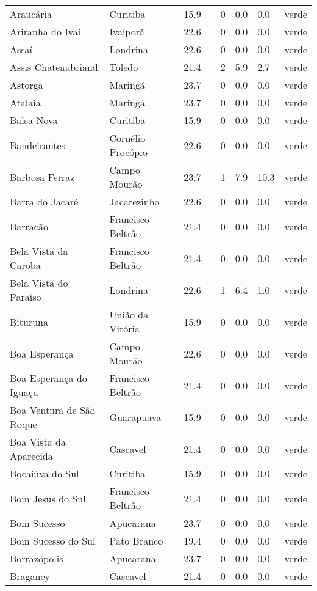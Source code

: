 \begin{longtable}{l|lllllll}
  Araucária & Curitiba & 15.9 &  & 0 & 0.0 & 0.0 & verde \\ 
  Ariranha do Ivaí & Ivaiporã & 22.6 &  & 0 & 0.0 & 0.0 & verde \\ 
  Assaí & Londrina & 22.6 &  & 0 & 0.0 & 0.0 & verde \\ 
  Assis Chateaubriand & Toledo & 21.4 &  & 2 & 5.9 & 2.7 & verde \\ 
  Astorga & Maringá & 23.7 &  & 0 & 0.0 & 0.0 & verde \\ 
  Atalaia & Maringá & 23.7 &  & 0 & 0.0 & 0.0 & verde \\ 
  Balsa Nova & Curitiba & 15.9 &  & 0 & 0.0 & 0.0 & verde \\ 
  Bandeirantes & Cornélio Procópio & 22.6 &  & 0 & 0.0 & 0.0 & verde \\ 
  Barbosa Ferraz & Campo Mourão & 23.7 &  & 1 & 7.9 & 10.3 & verde \\ 
  Barra do Jacaré & Jacarezinho & 22.6 &  & 0 & 0.0 & 0.0 & verde \\ 
  Barracão & Francisco Beltrão & 21.4 &  & 0 & 0.0 & 0.0 & verde \\ 
  Bela Vista da Caroba & Francisco Beltrão & 21.4 &  & 0 & 0.0 & 0.0 & verde \\ 
  Bela Vista do Paraíso & Londrina & 22.6 &  & 1 & 6.4 & 1.0 & verde \\ 
  Bituruna & União da Vitória & 15.9 &  & 0 & 0.0 & 0.0 & verde \\ 
  Boa Esperança & Campo Mourão & 22.6 &  & 0 & 0.0 & 0.0 & verde \\ 
  Boa Esperança do Iguaçu & Francisco Beltrão & 21.4 &  & 0 & 0.0 & 0.0 & verde \\ 
  Boa Ventura de São Roque & Guarapuava & 15.9 &  & 0 & 0.0 & 0.0 & verde \\ 
  Boa Vista da Aparecida & Cascavel & 21.4 &  & 0 & 0.0 & 0.0 & verde \\ 
  Bocaiúva do Sul & Curitiba & 15.9 &  & 0 & 0.0 & 0.0 & verde \\ 
  Bom Jesus do Sul & Francisco Beltrão & 21.4 &  & 0 & 0.0 & 0.0 & verde \\ 
  Bom Sucesso & Apucarana & 23.7 &  & 0 & 0.0 & 0.0 & verde \\ 
  Bom Sucesso do Sul & Pato Branco & 19.4 &  & 0 & 0.0 & 0.0 & verde \\ 
  Borrazópolis & Apucarana & 23.7 &  & 0 & 0.0 & 0.0 & verde \\ 
  Braganey & Cascavel & 21.4 &  & 0 & 0.0 & 0.0 & verde \\ 

\end{longtable}
